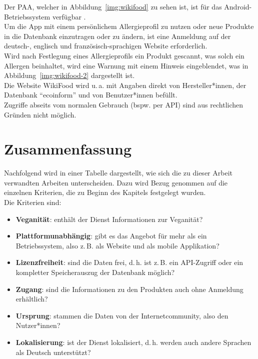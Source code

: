 Der \ac{PAA}, welcher in Abbildung~\ref{img:wikifood} zu sehen ist, 
ist für das Android-Betriebssystem verfügbar
.\\
Um die \ac{App} mit einem persönlichem Allergieprofil zu nutzen oder
neue Produkte in die Datenbank einzutragen oder zu ändern, ist
eine Anmeldung auf der deutsch-, englisch und französisch-sprachigen
Website erforderlich.\\
Wird nach Festlegung eines Allergieprofils ein Produkt gescannt, was
solch ein Allergen beinhaltet, wird eine Warnung mit einem Hinweis
eingeblendet, was in Abbildung~\ref{img:wikifood-2} dargestellt ist.\\
Die Website WikiFood wird u.\,a. mit Angaben direkt von Hersteller*innen, der
Datenbank "`ecoinform"' und von Benutzer*innen befüllt.\\
Zugriffe abseits vom normalen Gebrauch (bspw. per \ac{API}) sind aus
rechtlichen Gründen nicht möglich.

\clearpage
\section{Zusammenfassung}
\label{rel:zsf}

Nachfolgend wird in einer Tabelle dargestellt, wie sich die zu dieser Arbeit 
verwandten Arbeiten unterscheiden.
Dazu wird Bezug
genommen auf die einzelnen Kriterien, die zu Beginn des Kapitels
festgelegt wurden.\\
Die Kriterien sind:

\begin{itemize}
	\item \textbf{Veganität}: enthält der Dienst Informationen zur
			Veganität?
	\item \textbf{Plattformunabhängig}: gibt es das Angebot für
			mehr als ein Betriebssystem, also z.\,B. als Website und
			als mobile Applikation?
	\item \textbf{Lizenzfreiheit}: sind die Daten frei, d.\,h. ist z.\,B.
			ein \ac{API}-Zugriff oder ein kompletter Speicherauszug
			der Datenbank möglich?
	\item \textbf{Zugang}: sind die Informationen zu den Produkten
			auch ohne Anmeldung erhältlich?
	\item \textbf{Ursprung}: stammen die Daten von der
			Internetcommunity, also den Nutzer*innen?
	\item \textbf{Lokalisierung}: ist der Dienst lokalisiert, d.\,h. werden auch andere
			Sprachen als Deutsch unterstützt?
\end{itemize}

